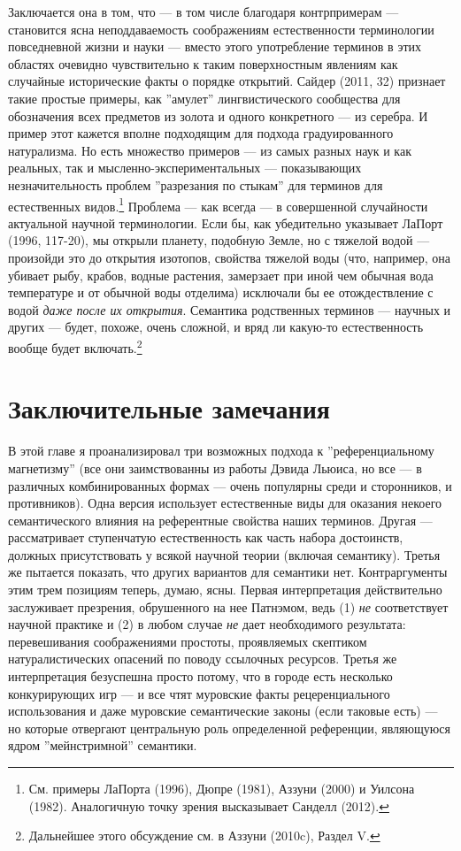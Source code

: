\documentclass[11pt]{book}
\begin{document}
Заключается она в том, что --- в том числе благодаря контрпримерам --- становится ясна неподдаваемость соображениям естественности терминологии повседневной жизни и науки --- вместо этого употребление терминов в этих областях очевидно чувствительно к таким поверхностным явлениям как случайные исторические факты о порядке открытий. Сайдер (2011, 32) признает такие простые примеры, как ''амулет'' лингвистического сообщества для обозначения всех предметов из золота и одного конкретного --- из серебра. И пример этот кажется вполне подходящим для подхода градуированного натурализма. Но есть множество примеров --- из самых разных наук и как реальных, так и мысленно-экспериментальных --- показывающих незначительность проблем ''разрезания по стыкам'' для терминов для естественных видов.\footnote{См. примеры ЛаПорта (1996), Дюпре (1981), Аззуни (2000) и Уилсона (1982). Аналогичную точку зрения высказывает Санделл (2012).} Проблема --- как всегда --- в совершенной случайности актуальной научной терминологии. Если бы, как убедительно указывает ЛаПорт (1996, 117-20), мы открыли планету, подобную Земле, но с тяжелой водой --- произойди это до открытия изотопов, свойства тяжелой воды (что, например, она убивает рыбу, крабов, водные растения, замерзает при иной чем обычная вода температуре и от обычной воды отделима) исключали бы ее отождествление с водой \textit{даже после их открытия}. Семантика родственных терминов --- научных и других --- будет, похоже, очень сложной, и вряд ли какую-то естественность вообще будет включать.\footnote{Дальнейшее этого обсуждение см. в Аззуни (2010c), Раздел V.}

\section{Заключительные замечания}

В этой главе я проанализировал три возможных подхода к ''референциальному магнетизму'' (все они заимствованны из работы Дэвида Льюиса, но все --- в различных комбинированных формах --- очень популярны среди и сторонников, и противников). Одна версия использует естественные виды для оказания некоего семантического влияния на референтные свойства наших терминов. Другая --- рассматривает ступенчатую естественность как часть набора достоинств, должных присутствовать у всякой научной теории (включая семантику). Третья же пытается показать, что других вариантов для семантики нет. Контраргументы этим трем позициям теперь, думаю, ясны. Первая интерпретация действительно заслуживает презрения, обрушенного на нее Патнэмом, ведь (1) \textit{не} соответствует научной практике и (2) в любом случае \textit{не} дает необходимого результата: перевешивания соображениями простоты, проявляемых скептиком натуралистических опасений по поводу ссылочных ресурсов. Третья же интерпретация безуспешна просто потому, что в городе есть несколько конкурирующих игр --- и все чтят муровские факты рецеренциального использования и даже муровские семантические законы (если таковые есть) --- но которые отвергают центральную роль определенной референции, являющуюся ядром ''мейнстримной'' семантики.
\end{document}

